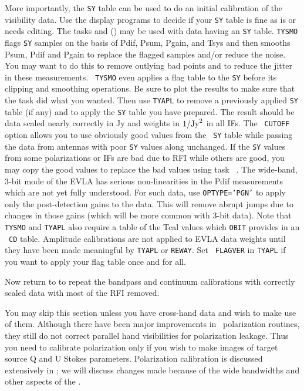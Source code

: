 More importantly, the {\tt SY} table can be used to do an initial
calibration of the visibility data.  Use the display programs to
decide if your {\tt SY} table is fine as is or needs editing.  The
tasks {\tt {}} and  {\tt {}} () may be
used with  data having an {\tt SY} table.  {\tt TYSMO}
flags {\tt SY} samples on the basis of Pdif, Psum, Pgain, and Tsys and
then smooths Psum, Pdif and Pgain to replace the flagged samples
and/or reduce the noise.  You may want to do this to remove outlying
bad points and to reduce the jitter in these measurements.  {\tt
TYSMO} even applies a flag table to the {\tt SY} before its clipping
and smoothing operations.  Be sure to plot the results to make sure
that the task did what you wanted.  Then use {\tt TYAPL} to remove a
previously applied {\tt SY} table (if any) and to apply the {\tt SY}
table you have prepared.  The result should be data scaled nearly
correctly in Jy and weights in $1/{\rm Jy}^2$ in all IFs.  The {\tt
CUTOFF} option allows you to use obviously good values from the {\tt
SY} table while passing the data from antennas with poor {\tt SY}
values along unchanged.  If the {\tt SY} values from some
polarizations or IFs are bad due to RFI while others are good, you
may copy the good values to replace the bad values using task {\tt
{}}\@.  The wide-band, 3-bit mode of the EVLA has serious
non-linearities in the Pdif measurements which are not yet fully
understood.  For such data, use {\tt OPTYPE='PGN'} to apply only the
post-detection gains to the data.  This will remove abrupt jumps due
to changes in those gains (which will be more common with 3-bit data).
Note that {\tt TYSMO} and {\tt TYAPL} also require a table of the Tcal
values which {\tt OBIT} provides in an \AIPS\ {\tt CD} table.
Amplitude calibrations are not applied to EVLA data weights until they
have been made meaningful by {\tt TYAPL} or {\tt REWAY}\@.  Set {\tt
FLAGVER} in {\tt TYAPL} if you want to apply your flag table once and
for all.

Now return to  to repeat the bandpass and continuum
calibrations with correctly scaled data with most of the RFI removed.


You may skip this section unless you have cross-hand
 data and wish to make use of them.  Although there
have been major improvements in \AIPS\ polarization routines, they
still do not correct parallel hand visibilities for polarization
leakage.  Thus you need to calibrate polarization only if you wish to
make images of target source Q and U Stokes parameters.  Polarization
calibration is discussed extensively in ; we will discuss
changes made because of the wide bandwidths and other aspects of the
\@.

